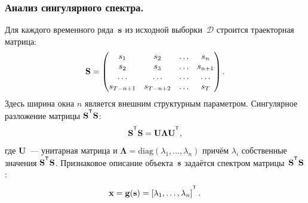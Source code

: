 \subsubsection{Анализ сингулярного спектра.}
Для каждого временного ряда~$\mathbf{s}$ из исходной выборки~$\mathcal{D}$ строится траекторная матрица:
\[
	\mathbf{S} = 
	\begin{pmatrix}
		s_1 & s_2 & \dots & s_n \\
		s_2 & s_3 & \dots & s_{n+1} \\
		\dots & \dots & \dots & \dots \\
		s_{T-n+1} & s_{T-n+2} & \dots & s_T
	\end{pmatrix}.
\]
Здесь ширина окна $n$ является внешним структурным параметром.
Сингулярное разложение матрицы $\mathbf{S}^{\T} \mathbf{S}$:
\[
\bS^{\T} \bS = \bU \boldsymbol{\Lambda} \bU^{\T},
\]
где $\mathbf{U}$~--- унитарная матрица и $\boldsymbol{\Lambda} = \mathrm{diag}(\lambda_1, \dots, \lambda_n)$ причём $\lambda_i$ собственные значения $\bS^{\T} \bS$. 
Признаковое описание объекта~$\mathbf{s}$ задаётся спектром матрицы~$\bS^{\T} \bS$:
\[
	\bx = \mathbf{g}(\bs) = \left[\lambda_1, \dots, \lambda_n\right]^{\T}.
\]

